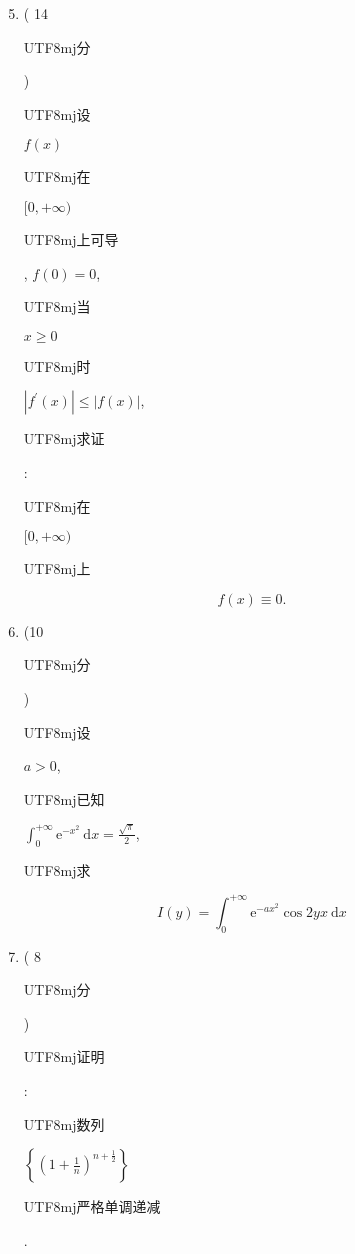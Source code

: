 \documentclass[10pt]{article}
\begin{document}
\begin{enumerate}
  \setcounter{enumi}{4}
  \item ( 14 \begin{CJK}{UTF8}{mj}分\end{CJK}) \begin{CJK}{UTF8}{mj}设\end{CJK} $f(x)$ \begin{CJK}{UTF8}{mj}在\end{CJK} $[0,+\infty)$ \begin{CJK}{UTF8}{mj}上可导\end{CJK}, $f(0)=0$, \begin{CJK}{UTF8}{mj}当\end{CJK} $x \geqslant 0$ \begin{CJK}{UTF8}{mj}时\end{CJK} $\left|f^{\prime}(x)\right| \leqslant|f(x)|$, \begin{CJK}{UTF8}{mj}求证\end{CJK}: \begin{CJK}{UTF8}{mj}在\end{CJK} $[0,+\infty)$ \begin{CJK}{UTF8}{mj}上\end{CJK}
\end{enumerate}
$$
f(x) \equiv 0 .
$$

\begin{enumerate}
  \setcounter{enumi}{5}
  \item (10 \begin{CJK}{UTF8}{mj}分\end{CJK}) \begin{CJK}{UTF8}{mj}设\end{CJK} $a>0$, \begin{CJK}{UTF8}{mj}已知\end{CJK} $\int_{0}^{+\infty} \mathrm{e}^{-x^{2}} \mathrm{~d} x=\frac{\sqrt{\pi}}{2}$, \begin{CJK}{UTF8}{mj}求\end{CJK}
\end{enumerate}
$$
I(y)=\int_{0}^{+\infty} \mathrm{e}^{-a x^{2}} \cos 2 y x \mathrm{~d} x
$$

\begin{enumerate}
  \setcounter{enumi}{6}
  \item ( 8 \begin{CJK}{UTF8}{mj}分\end{CJK}) \begin{CJK}{UTF8}{mj}证明\end{CJK}: \begin{CJK}{UTF8}{mj}数列\end{CJK} $\left\{\left(1+\frac{1}{n}\right)^{n+\frac{1}{2}}\right\}$ \begin{CJK}{UTF8}{mj}严格单调递减\end{CJK}.
\end{enumerate}
\end{document}
